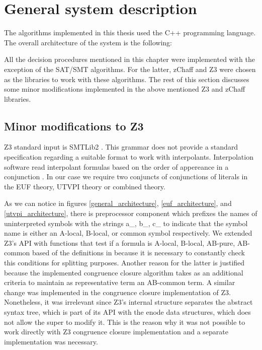 \section{General system description}

The algorithms implemented in this thesis used the C++ programming
language. The overall architecture of the system is the following:





All the decision procedures mentioned in this chapter
were implemented with the exception of the SAT/SMT algorithms.
For the latter, zChaff \cite{935565} and Z3 
\cite{10.1007/978-3-540-78800-3_24} were chosen as the 
libraries to work with these algorithms. 
The rest of this section discusses some minor modifications 
implemented in the above mentioned Z3 and zChaff libraries.

\subsection{Minor modifications to Z3}

Z3 standard input is SMTLib2 \cite{BarFT-SMTLIB}. This grammar
does not provide a standard specification regarding a suitable
format to work with interpolants. Interpolation software
read interpolant formulas based on the order of appereance
in a conjunction \cite{mcmillan2011interpolants}. In our case
we require two conjuncts of conjunctions of literals in the
EUF theory, UTVPI theory or combined theory. 

As we can notice in figures \ref{general_architecture}, \ref{euf_architecture},
and \ref{utvpi_architecture}, there is preprocessor component which prefixes
the names of uninterpreted symbols with the strings a\_, b\_, c\_
to indicate that the symbol name is either an A-local, B-local, or
common symbol respectively. We extended Z3's API with functions
that test if a formula is A-local, B-local, AB-pure, AB-common
based of the definitions in \cite{10.1007/11532231_26} because 
it is necessary to constantly check this conditions for splitting
purposes. Another reason for the latter is justified because the 
implemented congruence closure algorithm takes as an additional
criteria to maintain as representative term an AB-common term.
A similar change was implemented in the congruence closure implementation
of Z3. Nonetheless, it was irrelevant since Z3's internal structure
separates the abstract syntax tree, which is part of its API
with the enode data structures, which does not allow the super
to modify it. This is the reason why it was not
possible to work directly with Z3 congruence closure implementation
and a separate implementation was necessary.

